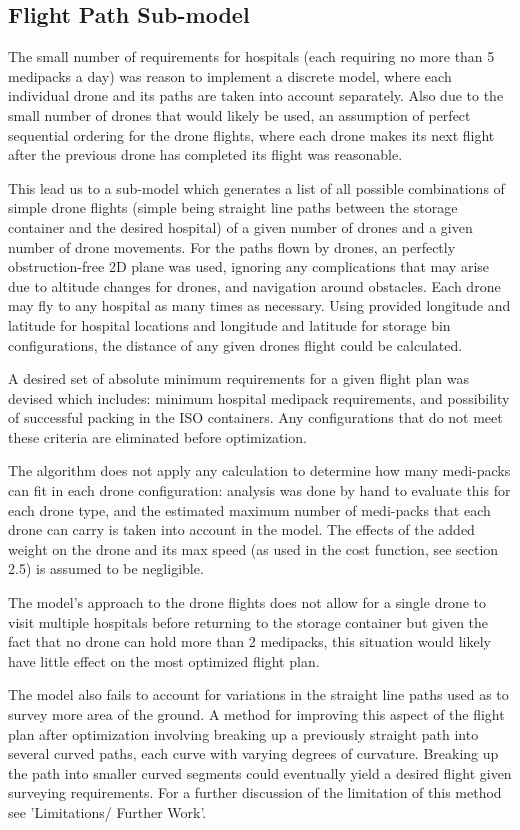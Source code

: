\documentclass[twocolumn,10pt]{asme2ej}
\begin{document}
 
\subsection{Flight Path Sub-model}
The small number of requirements for hospitals (each requiring no more than 5 medipacks a day) was reason to implement a discrete model, where each individual drone and its paths are taken into account separately. Also due to the small number of drones that would likely be used, an assumption of perfect sequential ordering for the drone flights, where each drone makes its next flight after the previous drone has completed its flight was reasonable. 

This lead us to a sub-model which generates a list of all possible combinations of simple drone flights (simple being straight line paths between the storage container and the desired hospital) of a given number of drones and a given number of drone movements. For the paths flown by drones, an perfectly obstruction-free 2D plane was used, ignoring any complications that may arise due to altitude changes for drones, and navigation around obstacles. Each drone may fly to any hospital as many times as necessary. Using provided longitude and latitude for hospital locations and longitude and latitude for storage bin configurations, the distance of any given drones flight could be calculated. 

A desired set of absolute minimum requirements for a given flight plan was devised which includes: minimum hospital medipack requirements, and possibility of successful packing in the ISO containers. Any configurations that do not meet these criteria are eliminated before optimization. 

The algorithm does not apply any calculation to determine how many medi-packs can fit in each drone configuration: analysis was done by hand to evaluate this for each drone type, and the estimated maximum number of medi-packs that each drone can carry is taken into account in the model. The effects of the added weight on the drone and its max speed (as used in the cost function, see section 2.5) is assumed to be negligible. 

The model's approach to the drone flights does not allow for a single drone to visit multiple hospitals before returning to the storage container but given the fact that no drone can hold more than 2 medipacks, this situation would likely have little effect on the most optimized flight plan. 

The model also fails to account for variations in the straight line paths used as to survey more area of the ground. A method for improving this aspect of the flight plan after optimization involving breaking up a previously straight path into several curved paths, each curve with varying degrees of curvature. Breaking up the path into smaller curved segments could eventually yield a desired flight given surveying requirements. For a further discussion of the limitation of this method see 'Limitations/ Further Work'.
\end{document}
